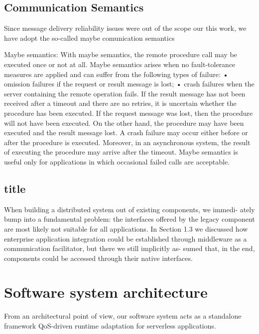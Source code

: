 \documentclass[12pt,a4paper]{report}
\begin{document}
\subsection{Communication Semantics}

Since message delivery reliability issues were out of the scope our this work, we have adopt the so-called maybe comunication semantics

Maybe semantics: With maybe semantics, the remote procedure call may be executed
once or not at all. Maybe semantics arises when no fault-tolerance measures are applied
and can suffer from the following types of failure:
• omission failures if the request or result message is lost;
• crash failures when the server containing the remote operation fails.
If the result message has not been received after a timeout and there are no retries, it is
uncertain whether the procedure has been executed. If the request message was lost, then
the procedure will not have been executed. On the other hand, the procedure may have
been executed and the result message lost. A crash failure may occur either before or
after the procedure is executed. Moreover, in an asynchronous system, the result of
executing the procedure may arrive after the timeout. Maybe semantics is useful only for
applications in which occasional failed calls are acceptable.


\subsection{title}

When building a distributed system out of existing components, we immedi-
ately bump into a fundamental problem: the interfaces offered by the legacy
component are most likely not suitable for all applications. In Section 1.3 we
discussed how enterprise application integration could be established through
middleware as a communication facilitator, but there we still implicitly as-
sumed that, in the end, components could be accessed through their native
interfaces.


\section{Software system architecture}

From an architectural point of view, our software system acts as a standalone framework QoS-driven runtime adaptation for serverless applications.
\end{document}
